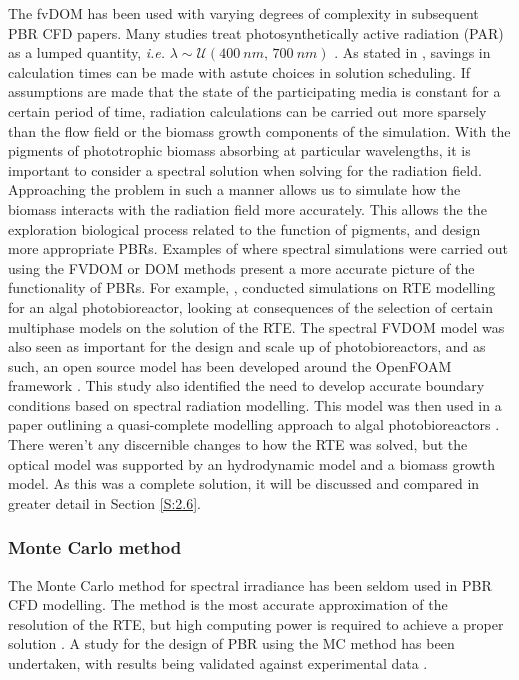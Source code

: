 The fvDOM has been used with varying degrees of complexity in subsequent PBR CFD papers. Many studies treat photosynthetically active radiation (PAR) as a lumped quantity, \textit{i.e.} $\lambda \sim \mathcal{U}(400\ nm ,\, 700\ nm)$
\cite{soman2015,pandey2015,wheaton2012,huang2011,eltayeb2010}. 
\skippingparagraph
As stated in \cite{krishnamoorthy2014}, savings in calculation times can be made with astute choices in solution scheduling. If assumptions are made that the state of the participating media is constant for a certain period of time, radiation calculations can be carried out more sparsely than the flow field or the biomass growth components of the simulation. With the pigments of phototrophic biomass absorbing at particular wavelengths, it is important to consider a spectral solution when solving for the radiation field. Approaching the problem in such a manner allows us to simulate how the biomass interacts with the radiation field more accurately. This allows the the exploration biological process related to the function of pigments, and design more appropriate PBRs. Examples of where spectral simulations were carried out using the FVDOM or DOM methods present a more accurate picture of the functionality of PBRs. For example, \cite{krishnamoorthy2014},  conducted simulations on RTE modelling for an algal photobioreactor, looking at consequences of the selection of certain multiphase models on the solution of the RTE. The spectral FVDOM model was also seen as important for the design and scale up of photobioreactors, and as such, an open source model has been developed around the OpenFOAM framework \cite{kong2014}. This study also identified the need to develop accurate boundary conditions based on spectral radiation modelling. This model was then used in a paper outlining a quasi-complete modelling approach to algal photobioreactors \cite{gao2016}. There weren't any discernible changes to how the RTE was solved, but the optical model was supported by an hydrodynamic model and a biomass growth model. As this was a complete solution, it will be discussed and compared in greater detail in Section \ref{S:2.6}. 
\skippingparagraph

\subsubsection{Monte Carlo method}
The Monte Carlo method for spectral irradiance has been seldom used in PBR CFD modelling. The method is the most accurate approximation of the resolution of the RTE, but high computing power is required to achieve a proper solution \cite{kong2014}. A study for the design of PBR using the MC method has been undertaken, with results being validated against experimental data \cite{heinrich2012}.

